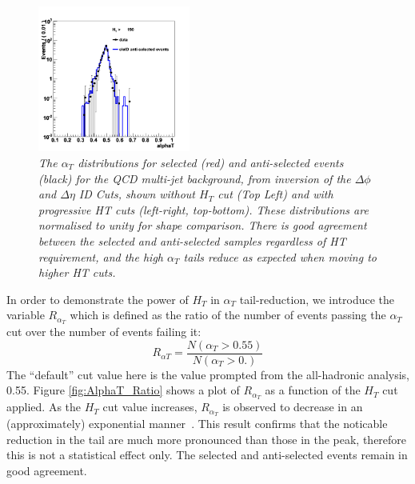 \begin{figure}[h!]
\hspace*{3mm}
\includegraphics[width=50mm]{Plots/mc-alphaT-6}

\caption{\textit{The $\alpha_{T}$ distributions for selected (red) and anti-selected events (black) for the QCD multi-jet background, from inversion of the $\Delta \phi$ and $\Delta \eta$ ID Cuts, shown without $H_{T}$ cut (Top Left) and with progressive HT cuts (left-right, top-bottom). These distributions are normalised to unity for shape comparison. There is good agreement between the selected and anti-selected samples regardless of HT requirement, and the high $\alpha_{T}$ tails reduce as expected when moving to higher HT cuts.}}
\label{fig:AlphaTbyHT}
\end{figure}

In order to demonstrate the power of $H_{T}$ in $\alpha_{T}$ tail-reduction, we introduce the variable $R_{\alpha_T}$ which is defined as the ratio of the number of events passing the $\alpha_T$ cut over the number of events failing it:
\begin{equation}
R_{\alpha T} = \frac{N(\alpha_{T}>0.55)}{N(\alpha_{T}>0.)}
\end{equation}
The ``default'' cut value here is the value prompted from the all-hadronic analysis, 0.55. Figure \ref{fig:AlphaT_Ratio} shows a plot of $R_{\alpha_T}$ as a function of the $H_{T}$ cut applied. As the $H_{T}$ cut value increases, $R_{\alpha_T}$ is observed to decrease in an (approximately) exponential manner~\cite{david}. This result confirms that the noticable reduction in the tail are much more pronounced than those in the peak, therefore this is not a statistical effect only. The selected and anti-selected events remain in good agreement.

